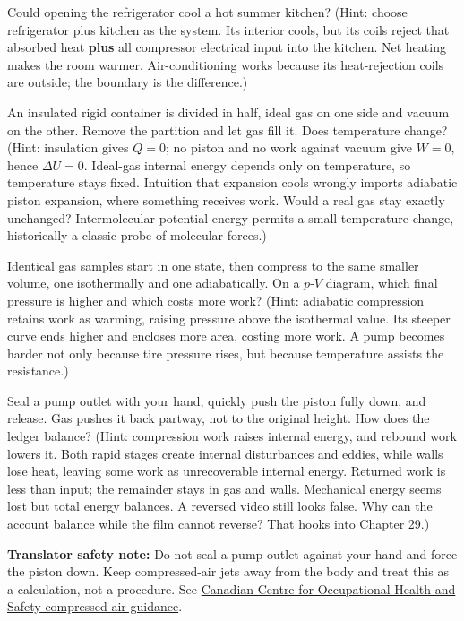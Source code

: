 \begin{puzzles}
  \item Could opening the refrigerator cool a hot summer kitchen? (Hint: choose refrigerator plus kitchen as the system. Its interior cools, but its coils reject that absorbed heat \textbf{plus} all compressor electrical input into the kitchen. Net heating makes the room warmer. Air-conditioning works because its heat-rejection coils are outside; the boundary is the difference.)
  \item An insulated rigid container is divided in half, ideal gas on one side and vacuum on the other. Remove the partition and let gas fill it. Does temperature change? (Hint: insulation gives \(Q=0\); no piston and no work against vacuum give \(W=0\), hence \(\Delta U=0\). Ideal-gas internal energy depends only on temperature, so temperature stays fixed. Intuition that expansion cools wrongly imports adiabatic piston expansion, where something receives work. Would a real gas stay exactly unchanged? Intermolecular potential energy permits a small temperature change, historically a classic probe of molecular forces.)
  \item Identical gas samples start in one state, then compress to the same smaller volume, one isothermally and one adiabatically. On a \(p\)-\(V\) diagram, which final pressure is higher and which costs more work? (Hint: adiabatic compression retains work as warming, raising pressure above the isothermal value. Its steeper curve ends higher and encloses more area, costing more work. A pump becomes harder not only because tire pressure rises, but because temperature assists the resistance.)
  \item Seal a pump outlet with your hand, quickly push the piston fully down, and release. Gas pushes it back partway, not to the original height. How does the ledger balance? (Hint: compression work raises internal energy, and rebound work lowers it. Both rapid stages create internal disturbances and eddies, while walls lose heat, leaving some work as unrecoverable internal energy. Returned work is less than input; the remainder stays in gas and walls. Mechanical energy seems lost but total energy balances. A reversed video still looks false. Why can the account balance while the film cannot reverse? That hooks into Chapter 29.)

\textbf{Translator safety note:} Do not seal a pump outlet against your hand and force the piston down. Keep compressed-air jets away from the body and treat this as a calculation, not a procedure. See \href{https://www.ccohs.ca/oshanswers/safety_haz/compressed_air.html}{Canadian Centre for Occupational Health and Safety compressed-air guidance}.
\end{puzzles}
